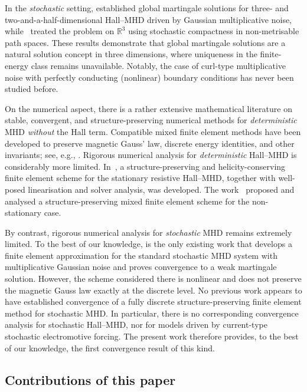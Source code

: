 \documentclass[11pt, reqno]{amsart}
\theoremstyle{definition}
\numberwithin{equation}{section}
\newcommand{\bb}{\mathbb}
\begin{document}
In the \emph{stochastic} setting, \cite{Yam17} established global martingale solutions for three- and two-and-a-half-dimensional Hall--MHD driven by Gaussian multiplicative noise, while~\cite{Mot23} treated the problem on $\bb{R}^3$ using stochastic compactness in non-metrisable path spaces. These results demonstrate that global martingale solutions are a natural solution concept in three dimensions, where uniqueness in the finite-energy class remains unavailable. Notably, the case of curl-type multiplicative noise with perfectly conducting (nonlinear) boundary conditions has never been studied before.

On the numerical aspect, there is a rather extensive mathematical literature on stable, convergent, and structure-preserving numerical methods for \emph{deterministic} MHD \emph{without} the Hall term. Compatible mixed finite element methods have been developed to preserve magnetic Gauss' law, discrete energy identities, and other invariants; see, e.g., \cite{VeiGomPerZam26, VeiHuMas25, HuMaXu17, HipLiMaoZhe18, MaoXi25}. Rigorous numerical analysis for \emph{deterministic} Hall--MHD is considerably more limited. In~\cite{LaaHuFar23}, a structure-preserving and helicity-conserving finite element scheme for the stationary resistive Hall--MHD, together with well-posed linearisation and solver analysis, was developed. The work~\cite{GolSoeTra26} proposed and analysed a structure-preserving mixed finite element scheme for the non-stationary case.

By contrast, rigorous numerical analysis for \emph{stochastic} MHD remains extremely limited. To the best of our knowledge, \cite{DeuFotTch25} is the only existing work that develops a finite element approximation for the standard stochastic MHD system with multiplicative Gaussian noise and proves convergence to a weak martingale solution. However, the scheme considered there is nonlinear and does not preserve the magnetic Gauss law exactly at the discrete level. No previous work appears to have established convergence of a fully discrete structure-preserving finite element method for stochastic MHD. In particular, there is no corresponding convergence analysis for stochastic Hall--MHD, nor for models driven by current-type stochastic electromotive forcing. The present work therefore provides, to the best of our knowledge, the first convergence result of this kind.


\subsection{Contributions of this paper}
\end{document}
